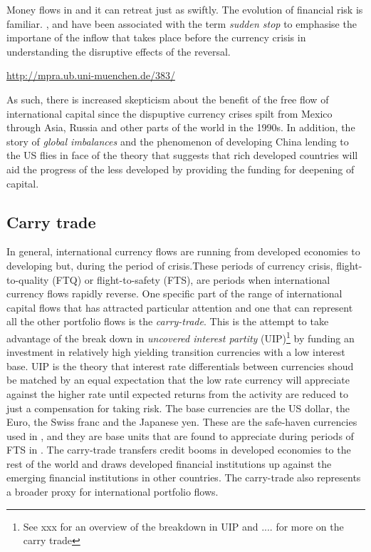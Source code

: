 \documentclass[12pt, a4paper, oneside]{article} %
\begin{document}
Money flows in and it can retreat just as swiftly.  The evolution of financial risk is familiar. \citet{DornbuschSS}, \citet{CalvoSS} and \citet{KrugmanSS} have been associated with the term \emph{sudden stop} to emphasise the importane of the inflow that takes place before the currency crisis in understanding the disruptive effects of the reversal.   

 \href{http://mpra.ub.uni-muenchen.de/383/}{http://mpra.ub.uni-muenchen.de/383/}

As such, there is increased skepticism about the benefit of the free flow of international capital since the dispuptive currency crises spilt from Mexico through Asia, Russia and other parts of the world in the 1990s.  In addition, the story of \emph{global imbalances} and the phenomenon of developing China lending to the US flies in face of the theory that suggests that rich developed countries will aid the progress of the less developed by providing the funding for deepening of capital.  

\subsection{Carry trade}
In general, international currency flows are running from developed economies to developing but, during the period of crisis.These periods of currency crisis, flight-to-quality (FTQ) or flight-to-safety (FTS), are periods when international currency flows rapidly reverse. One specific part of the range of international capital flows that has attracted particular attention and one  that can represent all the other portfolio flows is the \emph{carry-trade}.  This is the attempt to take advantage of the break down in \emph{uncovered interest partity} (UIP)\footnote{See xxx for an overview of the breakdown in UIP and .... for more on the carry trade} by funding an investment in relatively high yielding transition currencies with a low interest base.  UIP is the theory that interest rate differentials between currencies shoud be matched by an equal expectation that the low rate currency will appreciate against the higher rate until expected returns from the activity are reduced to just a compensation for taking risk. The base currencies are the US dollar, the Euro, the Swiss franc and the Japanese yen.  These are the safe-haven currencies used in \citet{HabibStracca}, and they are base units that are found to appreciate during periods of FTS in \citet{FTS}.   The carry-trade transfers credit booms in developed economies to the rest of the world and draws developed financial institutions up against the emerging financial institutions in other countries. The carry-trade also represents a broader proxy for international portfolio flows.   
\end{document}
